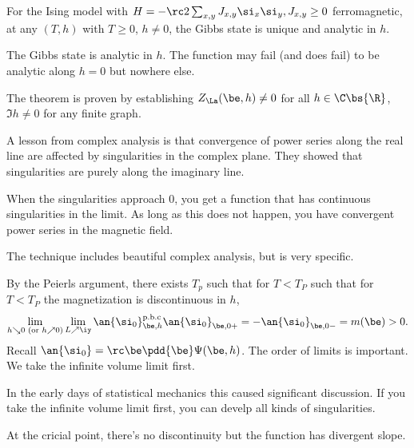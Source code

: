 \begin{thm}
For the Ising model with $H=-\rc 2 \sum_{x,y} J_{x,y} \si_x\si_y, J_{x,y} \ge 0$ ferromagnetic, at any $(T,h)$ with $T\ge 0$, $h\ne 0$, the Gibbs state is unique and analytic in $h$. %
\end{thm}
The Gibbs state is analytic in $h$. The function may fail (and does fail) to be analytic along $h=0$ but nowhere else. 

The theorem is proven by establishing $Z_\La (\be, h)\ne 0$ for all $h\in \C\bs \{\R\}$, $\Im h\ne 0$ for any finite graph.

A lesson from complex analysis is that convergence of power series along the real line are affected by singularities in the complex plane. They showed that singularities are purely along the imaginary line.

When the singularities approach 0, you get a function that has continuous singularities in the limit. As long as this does not happen, you have convergent power series in the magnetic field.

The technique includes beautiful complex analysis, but is very specific.

By the Peierls argument, there exists $T_p$ such that for $T<T_P$ such that for $T<T_P$ the magnetization is discontinuous in $h$,
\[
\lim_{h\searrow0\text{ (or }
h\nearrow0)}
\lim_{L\nearrow \iy} \an{\si_0}_{\be, h}^{\text{p.b.c}}
\an{\si_0}_{\be, 0+} = -\an{\si_0}_{\be, 0-} = m(\be)>0.
\]
Recall $\an{\si_0} = \rc\be \pdd{\be}\Psi(\be, h)$.
The order of limits is important. We take the infinite volume limit first.


In the early days of statistical mechanics this caused significant discussion. If you take the infinite volume limit first, you can develp all kinds of singularities.

At the cricial point, there's no discontinuity but the function has divergent slope. 


